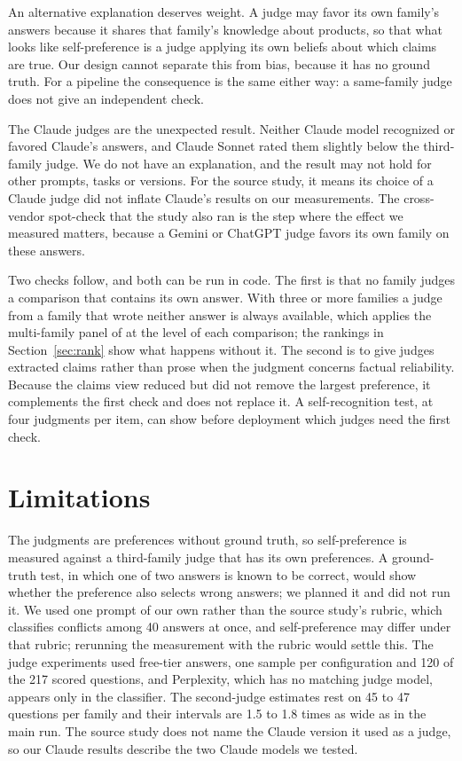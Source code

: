 \documentclass{article}
\begin{document}
An alternative explanation deserves weight. A judge may favor its own family's answers because it shares that family's knowledge about products, so that what looks like self-preference is a judge applying its own beliefs about which claims are true. Our design cannot separate this from bias, because it has no ground truth. For a pipeline the consequence is the same either way: a same-family judge does not give an independent check.

The Claude judges are the unexpected result. Neither Claude model recognized or favored Claude's answers, and Claude Sonnet rated them slightly below the third-family judge. We do not have an explanation, and the result may not hold for other prompts, tasks or versions. For the source study, it means its choice of a Claude judge did not inflate Claude's results on our measurements. The cross-vendor spot-check that the study also ran is the step where the effect we measured matters, because a Gemini or ChatGPT judge favors its own family on these answers.

Two checks follow, and both can be run in code. The first is that no family judges a comparison that contains its own answer. With three or more families a judge from a family that wrote neither answer is always available, which applies the multi-family panel of \citet{verga2024replacing} at the level of each comparison; the rankings in Section~\ref{sec:rank} show what happens without it. The second is to give judges extracted claims rather than prose when the judgment concerns factual reliability. Because the claims view reduced but did not remove the largest preference, it complements the first check and does not replace it. A self-recognition test, at four judgments per item, can show before deployment which judges need the first check.

\section{Limitations}
\label{sec:limits}

The judgments are preferences without ground truth, so self-preference is measured against a third-family judge that has its own preferences. A ground-truth test, in which one of two answers is known to be correct, would show whether the preference also selects wrong answers; we planned it and did not run it. We used one prompt of our own rather than the source study's rubric, which classifies conflicts among 40 answers at once, and self-preference may differ under that rubric; rerunning the measurement with the rubric would settle this. The judge experiments used free-tier answers, one sample per configuration and 120 of the 217 scored questions, and Perplexity, which has no matching judge model, appears only in the classifier. The second-judge estimates rest on 45 to 47 questions per family and their intervals are 1.5 to 1.8 times as wide as in the main run. The source study does not name the Claude version it used as a judge, so our Claude results describe the two Claude models we tested.
\end{document}
